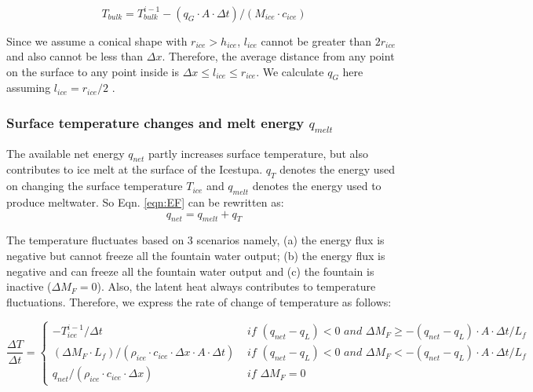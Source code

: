 \documentclass[utf8]{frontiersSCNS} %
\begin{document}
\begin{equation} T_{bulk} = T_{bulk}^{i-1} - (q_{G} \cdot A \cdot \Delta t)/(M_{ice} \cdot c_{ice}) \end{equation}

Since we assume a conical shape with $r_{ice} > h_{ice}$, $l_{ice}$ cannot be greater than $2r_{ice}$ and also cannot
be less than $\Delta x$. Therefore, the average distance from any point on the surface to any point inside is $\Delta
x \leq l_{ice} \leq r_{ice}$. We calculate $q_{G}$ here assuming $l_{ice} = r_{ice}/2$ .

\subsubsection{Surface temperature changes and melt energy $q_{melt}$}

The available net energy $q_{net}$ partly increases surface temperature, but also contributes to ice melt at the
surface of the Icestupa. $q_{T}$ denotes the energy used on changing the surface temperature $T_{ice}$ and $q_{melt}$
denotes the energy used to produce meltwater. So Eqn. \ref{eqn:EF} can be rewritten as: \begin{equation} q_{net} =
q_{melt} + q_{T} \end{equation}

The temperature fluctuates based on 3 scenarios namely, (a) the energy flux is negative but cannot freeze all the
fountain water output; (b) the energy flux is negative and can freeze all the fountain water output and (c) the
fountain is inactive ($\Delta M_{F}=0$). Also, the latent heat always contributes to temperature fluctuations.
Therefore, we express the rate of change of temperature as follows:

\begin{equation} \frac{\Delta T}{\Delta t} = \left\{ \begin{array}{ll} -T_{ice}^{i-1}/\Delta t & \textit{ if }
    (q_{net}-q_{L}) < 0 \textit{ and } \Delta M_{F} \geq -(q_{net}-q_{L})\cdot A \cdot \Delta t/L_f  \\ (\Delta M_{F}
    \cdot L_f )/(\rho_{ice} \cdot c_{ice} \cdot  \Delta x \cdot A \cdot \Delta t) & \textit{ if } (q_{net}-q_{L}) < 0
    \textit{ and } \Delta M_{F} < -(q_{net}-q_{L})\cdot A \cdot \Delta t/L_f  \\ q_{net}/ (\rho_{ice}\cdot c_{ice}
    \cdot \Delta x)& \textit{ if } \Delta M_{F} = 0
         
    \end{array} \right.  \label{eqn:T} \end{equation}
\end{document}
